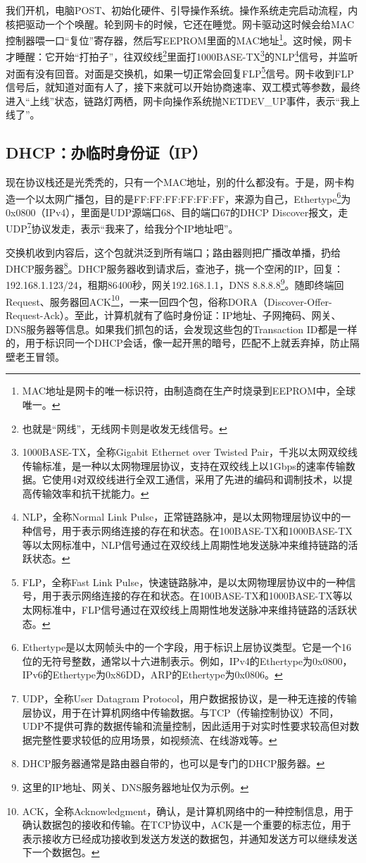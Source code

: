 我们开机，电脑POST、初始化硬件、引导操作系统。操作系统走完启动流程，内核把驱动一个个唤醒。轮到网卡的时候，它还在睡觉。网卡驱动这时候会给MAC控制器喂一口“复位”寄存器，然后写EEPROM里面的MAC地址\footnote{MAC地址是网卡的唯一标识符，由制造商在生产时烧录到EEPROM中，全球唯一。}。这时候，网卡才睡醒：它开始“打拍子”，往双绞线\footnote{也就是“网线”，无线网卡则是收发无线信号。}里面打1000BASE-TX\footnote{1000BASE-TX，全称Gigabit Ethernet over Twisted Pair，千兆以太网双绞线传输标准，是一种以太网物理层协议，支持在双绞线上以1Gbps的速率传输数据。它使用4对双绞线进行全双工通信，采用了先进的编码和调制技术，以提高传输效率和抗干扰能力。}的NLP\footnote{NLP，全称Normal Link Pulse，正常链路脉冲，是以太网物理层协议中的一种信号，用于表示网络连接的存在和状态。在100BASE-TX和1000BASE-TX等以太网标准中，NLP信号通过在双绞线上周期性地发送脉冲来维持链路的活跃状态。}信号，并监听对面有没有回音。对面是交换机，如果一切正常会回复FLP\footnote{FLP，全称Fast Link Pulse，快速链路脉冲，是以太网物理层协议中的一种信号，用于表示网络连接的存在和状态。在100BASE-TX和1000BASE-TX等以太网标准中，FLP信号通过在双绞线上周期性地发送脉冲来维持链路的活跃状态。}信号。网卡收到FLP信号后，就知道对面有人了，接下来就可以开始协商速率、双工模式等参数，最终进入“上线”状态，链路灯两栖，网卡向操作系统抛NETDEV\_UP事件，表示“我上线了”。

\subsection{DHCP：办临时身份证（IP）}

现在协议栈还是光秃秃的，只有一个MAC地址，别的什么都没有。于是，网卡构造一个以太网广播包，目的是FF:FF:FF:FF:FF:FF，来源为自己，Ethertype\footnote{Ethertype是以太网帧头中的一个字段，用于标识上层协议类型。它是一个16位的无符号整数，通常以十六进制表示。例如，IPv4的Ethertype为0x0800，IPv6的Ethertype为0x86DD，ARP的Ethertype为0x0806。}为0x0800（IPv4），里面是UDP源端口68、目的端口67的DHCP Discover报文，走UDP\footnote{UDP，全称User Datagram Protocol，用户数据报协议，是一种无连接的传输层协议，用于在计算机网络中传输数据。与TCP（传输控制协议）不同，UDP不提供可靠的数据传输和流量控制，因此适用于对实时性要求较高但对数据完整性要求较低的应用场景，如视频流、在线游戏等。}协议发走，表示“我来了，给我分个IP地址吧”。

交换机收到内容后，这个包就洪泛到所有端口；路由器则把广播改单播，扔给DHCP服务器\footnote{DHCP服务器通常是路由器自带的，也可以是专门的DHCP服务器。}。DHCP服务器收到请求后，查池子，挑一个空闲的IP，回复：192.168.1.123/24，租期86400秒，网关192.168.1.1，DNS 8.8.8.8\footnote{这里的IP地址、网关、DNS服务器地址仅为示例。}。随即终端回Request、服务器回ACK\footnote{ACK，全称Acknowledgment，确认，是计算机网络中的一种控制信息，用于确认数据包的接收和传输。在TCP协议中，ACK是一个重要的标志位，用于表示接收方已经成功接收到发送方发送的数据包，并通知发送方可以继续发送下一个数据包。}，一来一回四个包，俗称DORA（Discover-Offer-Request-Ack）。至此，计算机就有了临时身份证：IP地址、子网掩码、网关、DNS服务器等信息。如果我们抓包的话，会发现这些包的Transaction ID都是一样的，用于标识同一个DHCP会话，像一起开黑的暗号，匹配不上就丢弃掉，防止隔壁老王冒领。

